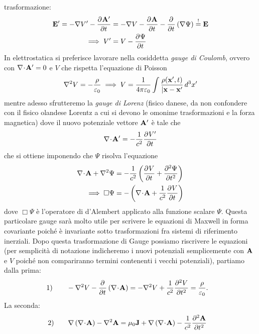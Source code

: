 trasformazione:
\begin{align}
  \v{ E }' = -\nabla V' - \der{\v{ A }'}{t} &= -\nabla V - \der{\v{ A }}{t} - \der{}{t} \left( \nabla \Psi \right) \overset{!}{=} \v{ E }
  \\
  \implies V' &= V - \der{\Psi}{t} 
\end{align}
In elettrostatica si preferisce lavorare nella cosiddetta \textit{gauge di Coulomb}, ovvero con $ \nabla\!\cdot\!\v{ A' } = 0 $ e $ V $ che rispetta 
l'equazione di Poisson 
\begin{align}
  \nabla^2 V = -\frac{\rho}{\eps_0} \implies V = \frac{1}{4\pi\eps_0} \int \frac{\rho(\v{ x }', t)}{|\v{ x }-\v{ x }'} \,d^3x'
\end{align}
mentre adesso sfrutteremo la \textit{gauge di Lorenz} (fisico danese, da non confondere con il fisico olandese Lorentz a cui si devono le omonime trasformazioni e 
la forza magnetica) dove il nuovo potenziale vettore $ \v{ A }' $ è tale che
\begin{align}
  \nabla\!\cdot\!\v{ A }' = -\frac{1}{c^2} \der{V'}{t}
\end{align}
che si ottiene imponendo che $ \Psi $ risolva l'equazione
\begin{align}
  \nabla\!\cdot\!\v{ A } + \nabla^2 \Psi &= -\frac{1}{c^2} \left( \der{V}{t} + \der[2]{\Psi}{t} \right)
  \\
  \implies \Box\Psi &= - \left( \nabla\!\cdot\!\v{ A } + \frac{1}{c^2} \der{V}{t} \right)
\end{align}
dove $ \Box \Psi $ è l'operatore di d'Alembert applicato alla funzione scalare $ \Psi $. Questa particolare gauge sarà molto utile per scrivere le 
equazioni di Maxwell in forma covariante poiché è invariante sotto trasformazioni fra sistemi di riferimento inerziali. Dopo questa trasformazione di Gauge 
possiamo riscrivere le equazioni (per semplicità di notazione indicheremo i nuovi potenziali semplicemente con $ \v{ A } $ e $ V $ poiché non 
compariranno termini contenenti i vecchi potenziali), partiamo dalla prima:
\begin{align}
 \left.1\right)\qquad &-\nabla^2 V - \der{}{t}\left( \nabla\!\cdot\!\v{ A } \right) = -\nabla^2 V + \frac{1}{c^2} \der[2]{V}{t} = \frac{\rho}{\eps_0}.
\end{align}
La seconda:
\begin{align}
  \left.2\right)\qquad &\nabla\left( \nabla\!\cdot\!\v{ A } \right) -\nabla^2 \v{ A } 
  = \mu_0 \v{ J } + \nabla \left( \nabla\!\cdot\!\v{ A } \right) -\frac{1}{c^2}\der[2]{\v{ A }}{t}
\end{align}
